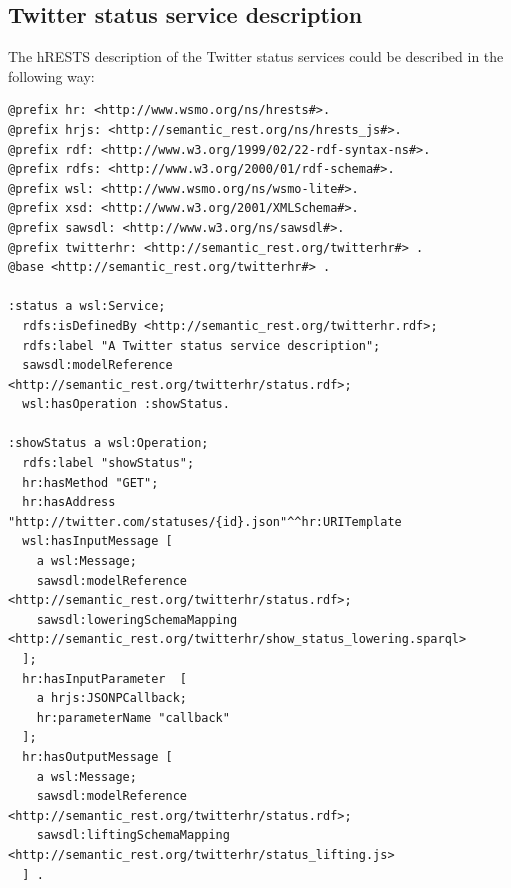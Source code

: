 \subsection{Twitter status service description}

The hRESTS description of the Twitter status services could be described in the following way:

\vspace{5 mm}
\begin{lstlisting}
@prefix hr: <http://www.wsmo.org/ns/hrests#>. 
@prefix hrjs: <http://semantic_rest.org/ns/hrests_js#>. 
@prefix rdf: <http://www.w3.org/1999/02/22-rdf-syntax-ns#>. 
@prefix rdfs: <http://www.w3.org/2000/01/rdf-schema#>. 
@prefix wsl: <http://www.wsmo.org/ns/wsmo-lite#>. 
@prefix xsd: <http://www.w3.org/2001/XMLSchema#>. 
@prefix sawsdl: <http://www.w3.org/ns/sawsdl#>.
@prefix twitterhr: <http://semantic_rest.org/twitterhr#> .
@base <http://semantic_rest.org/twitterhr#> .

:status a wsl:Service;
  rdfs:isDefinedBy <http://semantic_rest.org/twitterhr.rdf>;
  rdfs:label "A Twitter status service description";
  sawsdl:modelReference <http://semantic_rest.org/twitterhr/status.rdf>;
  wsl:hasOperation :showStatus.

:showStatus a wsl:Operation;
  rdfs:label "showStatus";
  hr:hasMethod "GET";
  hr:hasAddress "http://twitter.com/statuses/{id}.json"^^hr:URITemplate
  wsl:hasInputMessage [
    a wsl:Message;
    sawsdl:modelReference <http://semantic_rest.org/twitterhr/status.rdf>;
    sawsdl:loweringSchemaMapping <http://semantic_rest.org/twitterhr/show_status_lowering.sparql>
  ];
  hr:hasInputParameter  [
    a hrjs:JSONPCallback;
    hr:parameterName "callback"
  ];
  hr:hasOutputMessage [
    a wsl:Message;
    sawsdl:modelReference <http://semantic_rest.org/twitterhr/status.rdf>;
    sawsdl:liftingSchemaMapping <http://semantic_rest.org/twitterhr/status_lifting.js>
  ] .
\end{lstlisting} \vspace{5 mm}


